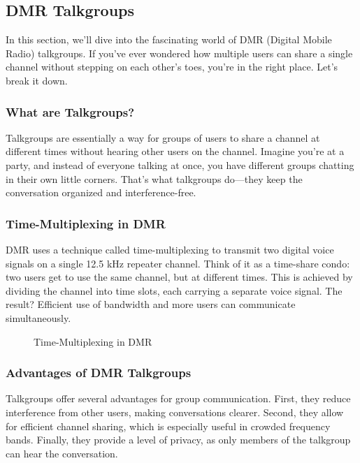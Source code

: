 \subsection{DMR Talkgroups}
\label{subsec:dmr-talkgroups2}

In this section, we'll dive into the fascinating world of DMR (Digital Mobile Radio) talkgroups. If you've ever wondered how multiple users can share a single channel without stepping on each other's toes, you're in the right place. Let's break it down.

\subsubsection*{What are Talkgroups?}
Talkgroups are essentially a way for groups of users to share a channel at different times without hearing other users on the channel. Imagine you're at a party, and instead of everyone talking at once, you have different groups chatting in their own little corners. That's what talkgroups do—they keep the conversation organized and interference-free.

\subsubsection*{Time-Multiplexing in DMR}
DMR uses a technique called time-multiplexing to transmit two digital voice signals on a single 12.5 kHz repeater channel. Think of it as a time-share condo: two users get to use the same channel, but at different times. This is achieved by dividing the channel into time slots, each carrying a separate voice signal. The result? Efficient use of bandwidth and more users can communicate simultaneously.

\begin{figure}[h]
    \centering
    \caption{Time-Multiplexing in DMR}
    \label{fig:dmr-time-multiplexing}
\end{figure}

\subsubsection*{Advantages of DMR Talkgroups}
Talkgroups offer several advantages for group communication. First, they reduce interference from other users, making conversations clearer. Second, they allow for efficient channel sharing, which is especially useful in crowded frequency bands. Finally, they provide a level of privacy, as only members of the talkgroup can hear the conversation.

